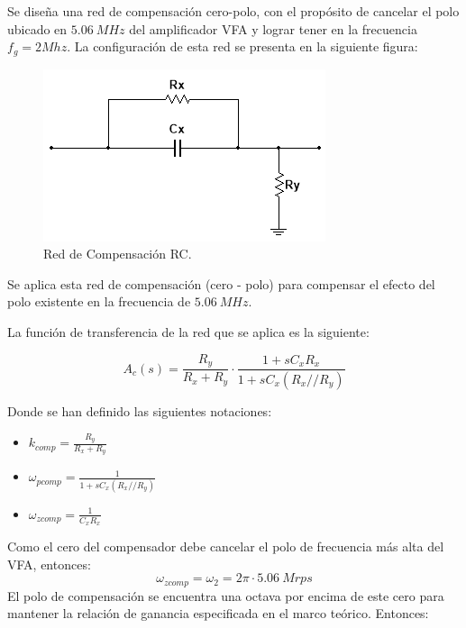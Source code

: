 \hspace{1mm} Se diseña una red de compensación cero-polo, con el propósito de cancelar el polo ubicado en \(5.06~MHz\) del amplificador VFA y lograr tener en la frecuencia \(f_g= 2Mhz\). La configuración de esta red se presenta en la siguiente figura:

\begin{figure}[!h]
    \centering
    \includegraphics[width=0.5\linewidth]{img/Red de compensacion RC.png}
    \caption{Red de Compensación RC.}
\end{figure}

\hspace{1mm} Se aplica esta red de compensación (cero - polo) para compensar el efecto del polo existente en la frecuencia de \(5.06~MHz\).

\bigskip
\hspace{1mm} La función de transferencia de la red que se aplica es la siguiente:

\begin{equation}
    A_c(s) = \frac{R_y}{R_x + R_y} \cdot \frac{1 + sC_x R_x}{1 + sC_x (R_x // R_y)}
\end{equation}

\hspace{1mm} Donde se han definido las siguientes notaciones:

\begin{itemize}
    \item \(k_{comp}=\frac{R_y}{R_x + R_y}\)
    \item \( \omega_{pcomp} =  \frac{1 }{1 + sC_x (R_x // R_y)}\)
    \item \(\omega_{zcomp} = \frac{1 }{ C_xR_x}\)
\end{itemize}

\hspace{1mm} Como el cero del compensador debe cancelar el polo de frecuencia más alta del VFA, entonces:
\begin{equation}
    \omega_{zcomp} = \omega_2 = 2\pi \cdot 5.06~Mrps
\end{equation}
\hspace{1mm} El polo de compensación se encuentra una octava por encima de este cero para mantener la relación de ganancia especificada en el marco teórico. Entonces:

